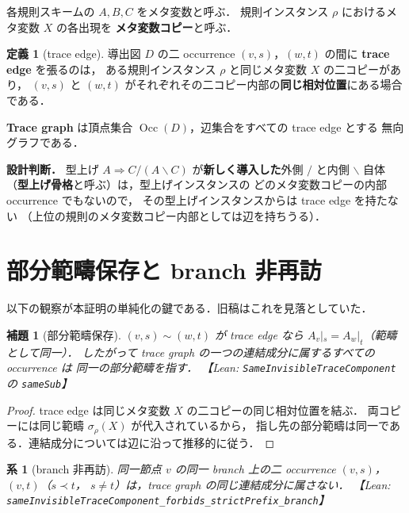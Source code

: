 \documentclass[paper=a4,fontsize=10pt,jafontscale=0.92]{jlreq}
\theoremstyle{plain}
\newtheorem{lemma}[theorem]{補題}
\newtheorem{corollary}[theorem]{系}
\theoremstyle{definition}
\newtheorem{definition}[theorem]{定義}
\theoremstyle{remark}
\newcommand{\Occ}{\operatorname{Occ}}
\newcommand{\bs}{\backslash}
\newcommand{\lean}[1]{\texttt{#1}}
\begin{document}
各規則スキームの $A,B,C$ をメタ変数と呼ぶ．
規則インスタンス $\rho$ におけるメタ変数 $X$ の各出現を
\textbf{メタ変数コピー}と呼ぶ．

\begin{definition}[trace edge]
導出図 $D$ の二 occurrence $(v,s)$，$(w,t)$ の間に \textbf{trace edge} を張るのは，
ある規則インスタンス $\rho$ と同じメタ変数 $X$ の二コピーがあり，
$(v,s)$ と $(w,t)$ がそれぞれその二コピー内部の\textbf{同じ相対位置}にある場合である．
\end{definition}

\textbf{Trace graph} は頂点集合 $\Occ(D)$，辺集合をすべての trace edge とする
無向グラフである．

\medskip
\noindent\textbf{設計判断．}
型上げ $A\Rightarrow C/(A\bs C)$ が\textbf{新しく導入した}外側 $/$ と内側 $\bs$
自体（\textbf{型上げ骨格}と呼ぶ）は，型上げインスタンスの
どのメタ変数コピーの内部 occurrence でもないので，
その型上げインスタンスからは trace edge を持たない
（上位の規則のメタ変数コピー内部としては辺を持ちうる）．

\section{部分範疇保存と branch 非再訪}
\label{sec:no-revisit}

以下の観察が本証明の単純化の鍵である．旧稿はこれを見落としていた．

\begin{lemma}[部分範疇保存]
\label{lem:same-sub}
$(v,s)\sim(w,t)$ が trace edge なら $A_v|_s = A_w|_t$（範疇として同一）．
したがって trace graph の一つの連結成分に属するすべての occurrence は
同一の部分範疇を指す．
【Lean: \lean{SameInvisibleTraceComponent} の \lean{sameSub}】
\end{lemma}

\begin{proof}
trace edge は同じメタ変数 $X$ の二コピーの同じ相対位置を結ぶ．
両コピーには同じ範疇 $\sigma_\rho(X)$ が代入されているから，
指し先の部分範疇は同一である．連結成分については辺に沿って推移的に従う．
\end{proof}

\begin{corollary}[branch 非再訪]
\label{cor:no-revisit}
同一節点 $v$ の同一 branch 上の二 occurrence $(v,s)$，$(v,t)$（$s \prec t$，
$s \neq t$）は，trace graph の同じ連結成分に属さない．
【Lean: \lean{sameInvisibleTraceComponent\_forbids\_strictPrefix\_branch}】
\end{corollary}
\end{document}
